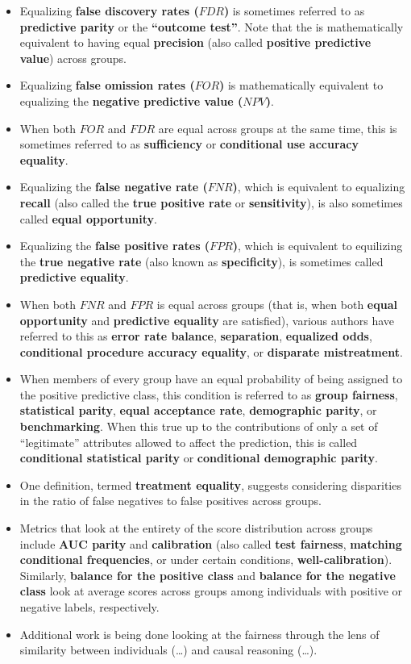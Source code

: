 \documentclass[]{krantz}
\begin{document}
\begin{itemize}
\item
  Equalizing \textbf{false discovery rates (\(FDR\))} is sometimes
  referred to as \textbf{predictive parity} or the \textbf{``outcome
  test''}. Note that the is mathematically equivalent to having equal
  \textbf{precision} (also called \textbf{positive predictive value})
  across groups.
\item
  Equalizing \textbf{false omission rates (\(FOR\))} is mathematically
  equivalent to equalizing the \textbf{negative predictive value
  (\(NPV\))}.
\item
  When both \(FOR\) and \(FDR\) are equal across groups at the same
  time, this is sometimes referred to as \textbf{sufficiency} or
  \textbf{conditional use accuracy equality}.
\item
  Equalizing the \textbf{false negative rate (\(FNR\))}, which is
  equivalent to equalizing \textbf{recall} (also called the \textbf{true
  positive rate} or \textbf{sensitivity}), is also sometimes called
  \textbf{equal opportunity}.
\item
  Equalizing the \textbf{false positive rates (\(FPR\))}, which is
  equivalent to equilizing the \textbf{true negative rate} (also known
  as \textbf{specificity}), is sometimes called \textbf{predictive
  equality}.
\item
  When both \(FNR\) and \(FPR\) is equal across groups (that is, when
  both \textbf{equal opportunity} and \textbf{predictive equality} are
  satisfied), various authors have referred to this as \textbf{error
  rate balance}, \textbf{separation}, \textbf{equalized odds},
  \textbf{conditional procedure accuracy equality}, or \textbf{disparate
  mistreatment}.
\item
  When members of every group have an equal probability of being
  assigned to the positive predictive class, this condition is referred
  to as \textbf{group fairness}, \textbf{statistical parity},
  \textbf{equal acceptance rate}, \textbf{demographic parity}, or
  \textbf{benchmarking}. When this true up to the contributions of only
  a set of ``legitimate'' attributes allowed to affect the prediction,
  this is called \textbf{conditional statistical parity} or
  \textbf{conditional demographic parity}.
\item
  One definition, termed \textbf{treatment equality}, suggests
  considering disparities in the ratio of false negatives to false
  positives across groups.
\item
  Metrics that look at the entirety of the score distribution across
  groups include \textbf{AUC parity} and \textbf{calibration} (also
  called \textbf{test fairness}, \textbf{matching conditional
  frequencies}, or under certain conditions, \textbf{well-calibration}).
  Similarly, \textbf{balance for the positive class} and \textbf{balance
  for the negative class} look at average scores across groups among
  individuals with positive or negative labels, respectively.
\item
  Additional work is being done looking at the fairness through the lens
  of similarity between individuals (\ldots{}) and causal reasoning
  (\ldots{}).
\end{itemize}
\end{document}
